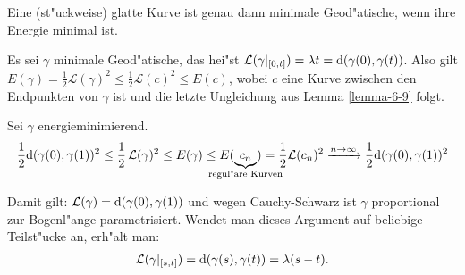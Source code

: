 \begin{Satz}
  Eine (st"uckweise) glatte Kurve ist genau dann minimale Geod"atische, wenn ihre Energie minimal ist.
\end{Satz}

\begin{bew}\begin{description}[font=\normalfont]
  \item[\quot{$\Rightarrow$}:]
    Es sei $\gamma$ minimale Geod"atische, das hei"st $\mathcal L(\gamma|_{[0,t]}) = \lambda t = \mathrm{d} (\gamma(0),\gamma(t))$.
    Also gilt $E(\gamma) = \frac{1}2 \mathcal L(\gamma)^2 \leq \frac{1}2 \mathcal L(c)^2 \leq E(c)$, wobei $c$ eine Kurve zwischen den Endpunkten von $\gamma$ ist und die letzte Ungleichung aus Lemma \ref{lemma-6-9} folgt.
  \item[\quot{$\Leftarrow$}:]
    Sei $\gamma$ energieminimierend.
    \begin{align*}
      \frac{1}2 \dop (\gamma(0), \gamma(1))^2 \leq \frac{1}2 \calL(\gamma)^2 \leq E(\gamma) \leq E(\underbrace{c_n}_{\mathclap{\text{regul"are Kurven}}}) = \frac{1}2 \mathcal L(c_n)^2 \xrightarrow{n\to\infty} \frac{1}2 \dop(\gamma(0),\gamma(1))^2
    \end{align*}
    \begin{center}\end{center}

	Damit gilt: $\mathcal L(\gamma) = \mathrm{d}(\gamma(0),\gamma(1))$ und wegen Cauchy-Schwarz ist $\gamma$ proportional zur Bogenl"ange parametrisiert.
	Wendet man dieses Argument auf beliebige Teilst"ucke an, erh"alt man:
	\begin{align*}
		\mathcal L(\gamma|_{[s,t]}) = \mathrm{d}(\gamma(s),\gamma(t)) = \lambda(s-t).
	\end{align*}
\end{description}\end{bew}

